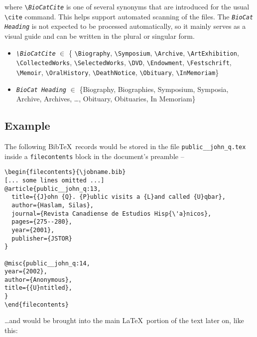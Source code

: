 \documentclass[letterpaper]{article}
\begin{document}
where {\tt \textbackslash \emph{BioCatCite}} is one of several
synonyms that are introduced for the usual \verb|\cite| command.  This
helps support automated scanning of the files.  The {\tt \emph{BioCat
    Heading}} is not expected to be processed automatically, so it
mainly serves as a visual guide and can be written in the plural or
singular form.

\bigskip

\begin{mdframed}
\begin{addmargin}[0em]{6em}
\begin{itemize}
\item {\tt \emph{\textbackslash BioCatCite}} $\in$ 
\{
\verb|\Biography|,
\verb|\Symposium|,
\verb|\Archive|,
\verb|\ArtExhibition|,
\verb|\CollectedWorks|,
\verb|\SelectedWorks|,
\verb|\DVD|,
\verb|\Endowment|,
\verb|\Festschrift|,
\verb|\Memoir|,
\verb|\OralHistory|,
\verb|\DeathNotice|,
\verb|\Obituary|,
\verb|\InMemoriam|\}
\item {\tt \emph{BioCat Heading}} $\in$ \{Biography, Biographies,
Symposium, Symposia,
Archive, Archives,
\ldots ,
Obituary, Obituaries,
In Memoriam\} 
\end{itemize}
\end{addmargin}
\end{mdframed}

\bigskip

\subsection*{Example}

The following Bib\TeX\ records would be stored in the file
\verb|public__john_q.tex| inside a \verb|filecontents| block
in the document's preamble --

\begin{verbatim}
\begin{filecontents}{\jobname.bib}
[... some lines omitted ...]
@article{public__john_q:13,
  title={{J}ohn {Q}. {P}ublic visits a {L}and called {U}qbar},
  author={Haslam, Silas},
  journal={Revista Canadiense de Estudios Hisp{\'a}nicos},
  pages={275--280},
  year={2001},
  publisher={JSTOR}
}

@misc{public__john_q:14,
year={2002},
author={Anonymous},
title={{U}ntitled},
}
\end{filecontents}
\end{verbatim}

\ldots and would be brought into the main \LaTeX\ portion of the text
later on, like this:
\end{document}
